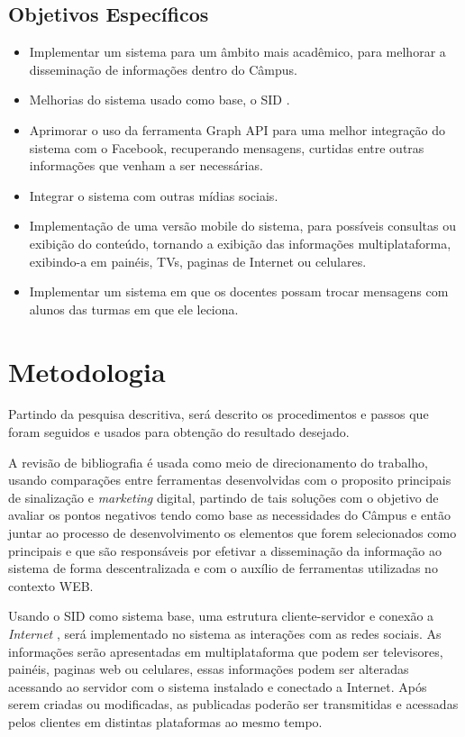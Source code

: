 \subsection{Objetivos Específicos}
	 \begin{itemize}
	\item Implementar um sistema para um âmbito mais acadêmico, para melhorar a disseminação de informações dentro do Câmpus.
	 	
	\item Melhorias do sistema usado como base, o SID \cite{sobrinho2017}.
	
	\item Aprimorar o uso da ferramenta Graph API para uma melhor integração do sistema com o Facebook, recuperando mensagens, curtidas entre outras informações que venham a ser necessárias.
	
	\item Integrar o sistema com outras mídias sociais.
	
	\item Implementação de uma versão mobile do sistema, para possíveis consultas ou exibição do conteúdo, tornando a exibição das informações multiplataforma, exibindo-a em painéis, TVs, paginas de Internet ou celulares.
	
	\item  Implementar um sistema em que os docentes possam trocar mensagens com alunos das turmas em que ele leciona.
	\end{itemize}
\section{Metodologia}
Partindo da pesquisa descritiva, será descrito os procedimentos e passos que foram seguidos e usados para obtenção do resultado desejado.
	
A revisão de bibliografia é usada como meio de direcionamento do trabalho, usando comparações entre ferramentas desenvolvidas com o proposito principais de sinalização e \textit{marketing} digital, partindo de tais soluções com o objetivo de avaliar os pontos negativos tendo como base as necessidades do Câmpus e então juntar ao processo de desenvolvimento os elementos que forem selecionados como principais e que são responsáveis por efetivar a disseminação da informação ao sistema de forma descentralizada e com o auxílio de ferramentas utilizadas no contexto WEB.
	 
Usando o SID como sistema base, uma estrutura cliente-servidor e conexão a \textit{Internet} , será implementado no sistema as interações com as redes sociais. As informações serão apresentadas em multiplataforma que podem ser televisores, painéis, paginas web ou celulares, essas informações podem ser alteradas acessando ao servidor com o sistema instalado e conectado a Internet. Após serem criadas ou modificadas, as publicadas poderão ser transmitidas e acessadas pelos clientes em distintas plataformas ao mesmo tempo.

